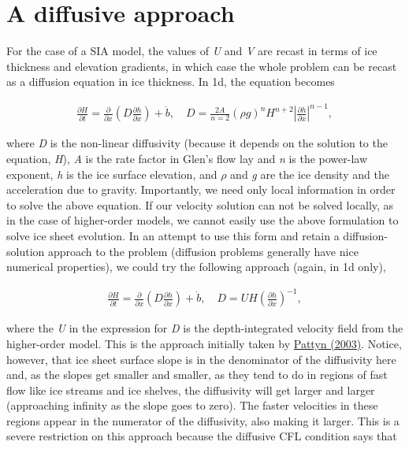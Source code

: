 \section{A diffusive approach}
For the case of a SIA model, the values of \textit{U} and \textit{V} are recast in terms of ice thickness and elevation gradients, in which case the whole problem can be recast as a diffusion equation in ice thickness. In 1d, the equation becomes

\begin{align*}
\frac{\partial H}{\partial t}=\frac{\partial }{\partial x}\left( D\frac{\partial h}{\partial x} \right)+\dot{b},\quad D=\frac{2A}{n=2}\left( \rho g \right)^{n}H^{n+2}\left| \frac{\partial h}{\partial x} \right|^{n-1},
\end{align*}

where \textit{D} is the non-linear diffusivity (because it depends on the solution to the equation, \textit{H}), \textit{A} is the rate factor in Glen's flow lay and \textit{n} is the power-law exponent, \textit{h} is the ice surface elevation, and \textit{\(\rho{}\)} and \textit{g} are the ice density and the acceleration due to gravity. Importantly, we need only local information in order to solve the above equation. If our velocity solution can not be solved locally, as in the case of higher-order models, we cannot easily use the above formulation to solve ice sheet evolution. In an attempt to use this form and retain a diffusion-solution approach to the problem (diffusion problems generally have nice numerical properties), we could try the following approach (again, in 1d only),

\begin{align*}
\frac{\partial H}{\partial t}=\frac{\partial }{\partial x}\left( D\frac{\partial h}{\partial x} \right)+\dot{b},\quad D=UH\left( \frac{\partial h}{\partial x} \right)^{-1},
\end{align*}

where the \textit{U} in the expression for \textit{D} is the depth-integrated velocity field from the higher-order model. This is the approach initially taken by \href{http://www.agu.org/journals/jb/jb0308/2002JB002329/}{Pattyn (2003)}. Notice, however, that ice sheet surface slope is in the denominator of the diffusivity here and, as the slopes get smaller and smaller, as they tend to do in regions of fast flow like ice streams and ice shelves, the diffusivity will get larger and larger (approaching infinity as the slope goes to zero). The faster velocities in these regions appear in the numerator of the diffusivity, also making it larger. This is a severe restriction on this approach because the diffusive CFL condition says that

